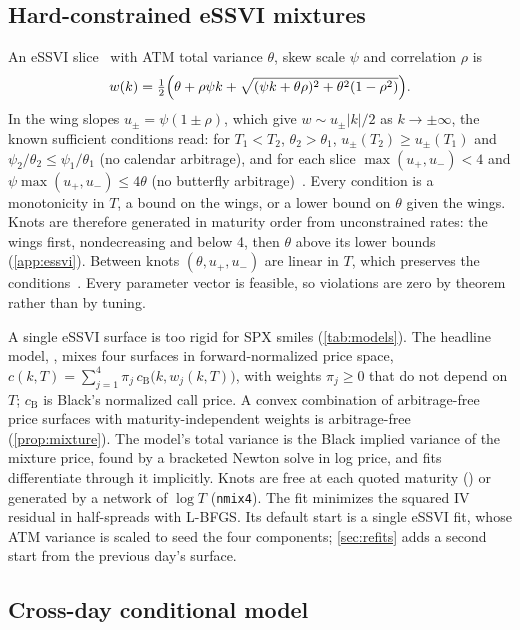 \subsection{Hard-constrained eSSVI mixtures}

An eSSVI slice~\citep{hendriks2019} with ATM total variance $\theta$, skew scale $\psi$ and
correlation $\rho$ is
\begin{equation}
  w(k)=\tfrac12\Bigl(\theta+\rho\psi k+\sqrt{(\psi k+\theta\rho)^2+\theta^2(1-\rho^2)}\Bigr).
\end{equation}
In the wing slopes $u_\pm=\psi(1\pm\rho)$, which give $w\sim u_\pm|k|/2$ as $k\to\pm\infty$, the
known sufficient conditions read: for $T_1<T_2$, $\theta_2>\theta_1$, $u_\pm(T_2)\ge u_\pm(T_1)$ and
$\psi_2/\theta_2\le\psi_1/\theta_1$ (no calendar arbitrage), and for each slice
$\max(u_+,u_-)<4$ and $\psi\max(u_+,u_-)\le 4\theta$ (no butterfly arbitrage)~\citep{gatheral2014,hendriks2019,mingone2022}.
Every condition is a monotonicity in $T$, a bound on the wings, or a lower bound on $\theta$ given
the wings. Knots are therefore generated in maturity order from unconstrained rates: the wings
first, nondecreasing and below 4, then $\theta$ above its lower bounds (\cref{app:essvi}). Between
knots $(\theta,u_+,u_-)$ are linear in $T$, which preserves the conditions~\citep{corbetta2019}.
Every parameter vector is feasible, so violations are zero by theorem rather than by tuning.

A single eSSVI surface is too rigid for SPX smiles (\cref{tab:models}). The headline model,
\mixfour, mixes four surfaces in forward-normalized price space,
$c(k,T)=\sum_{j=1}^{4}\pi_j\,c_{\text{B}}\bigl(k,w_j(k,T)\bigr)$, with weights $\pi_j\ge0$ that do not
depend on $T$; $c_{\text{B}}$ is Black's normalized call price. A convex combination of
arbitrage-free price surfaces with maturity-independent weights is arbitrage-free
(\cref{prop:mixture}). The model's total variance is the Black implied variance of the mixture price,
found by a bracketed Newton solve in log price, and fits differentiate through it implicitly. Knots
are free at each quoted maturity (\mixfour) or generated by a network of $\log T$ (\texttt{nmix4}).
The fit minimizes the squared IV residual in half-spreads with L-BFGS. Its default start is a single
eSSVI fit, whose ATM variance is scaled to seed the four components; \cref{sec:refits} adds a second
start from the previous day's surface.

\subsection{Cross-day conditional model}

